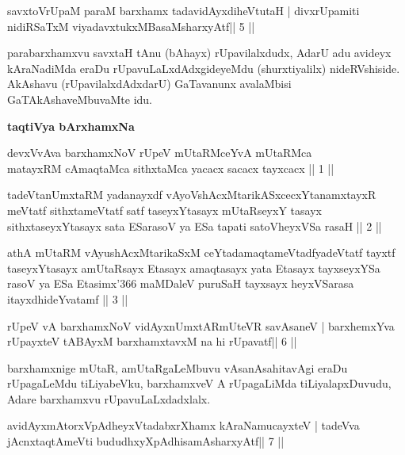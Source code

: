 

\begin{shl}
savxtoV\s rUpaM paraM barxhamx tadavidAyxdiheVtutaH |
divxrUpamiti nidiRSaTxM viyadavxtukxMBasaMsharxyAtf\hfill || 5 ||
\end{shl}

\begin{artha}
parabarxhamxvu savxtaH tAnu (bAhayx) rUpavilalxdudx, AdarU adu avideyx kAraNadiMda eraDu rUpavuLaLxdAdxgideyeMdu (shurxtiyalilx)  nideRVshiside. AkAshavu (rUpavilalxdAdxdarU) GaTavanunx avalaMbisi GaTAkAshaveMbuvaMte idu.
\end{artha}


{\centerline{\textbf{taqtiVya bArxhamxNa}}}
\medskip

\begin{shl}
devxVvAva barxhamxNoV rUpeV mUtaRMceYvA mUtaRMca\\
matayxRM cAmaqtaMca sithxtaMca yacacx sacacx tayxcacx || 1 ||

tadeVtanUmxtaRM yadanayxdf vAyoVshAcxMtarikASxcecxYtanamxtayxR
meVtatf sithxtameVtatf satf taseyxYtasayx mUtaRseyxY tasayx
sithxtaseyxYtasayx sata ESarasoV ya ESa tapati satoVheyxVSa rasaH || 2 || 

athA mUtaRM vAyushAcxMtarikaSxM ceYtadamaqtameVtadfyadeVtatf tayxtf
taseyxYtasayx amUtaRsayx Etasayx amaqtasayx yata Etasayx tayxseyxYSa
rasoV ya ESa Etasimx\char'366 maMDaleV puruSaH tayxsayx heyxVSarasa
itayxdhideYvatamf || 3 ||
\end{shl}


\begin{shl}
rUpeV vA barxhamxNoV vidAyxnUmxtARmUteVR savAsaneV |
barxhemxYva rUpayxteV tABAyxM barxhamxtavxM na hi rUpavatf\hfill || 6 ||
\end{shl}

\begin{artha}
barxhamxnige mUtaR, amUtaRgaLeMbuvu vAsanAsahitavAgi eraDu rUpagaLeMdu tiLiyabeVku, barxhamxveV A rUpagaLiMda tiLiyalapxDuvudu, Adare barxhamxvu rUpavuLaLxdadxlalx.
\end{artha}



\begin{shl}
avidAyxmAtorxVpAdheyxVtadabxrXhamx kAraNamucayxteV |
tadeVva jAcnxtaqtAmeVti bududhxyXpAdhisamAsharxyAtf\hfill || 7 ||
\end{shl}

